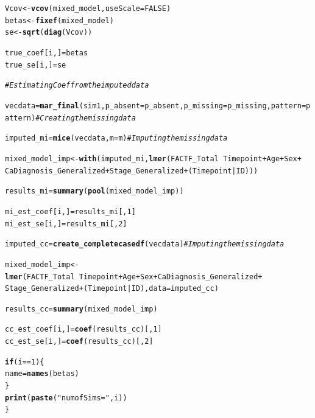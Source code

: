 \documentclass[fleqn,10pt]{wlscirep}\usepackage[]{graphicx}\usepackage[]{color}
\makeatletter
\newcommand{\hlnum}[1]{\textcolor[rgb]{0.686,0.059,0.569}{#1}}%
\newcommand{\hlstr}[1]{\textcolor[rgb]{0.192,0.494,0.8}{#1}}%
\newcommand{\hlcom}[1]{\textcolor[rgb]{0.678,0.584,0.686}{\textit{#1}}}%
\newcommand{\hlopt}[1]{\textcolor[rgb]{0,0,0}{#1}}%
\newcommand{\hlstd}[1]{\textcolor[rgb]{0.345,0.345,0.345}{#1}}%
\newcommand{\hlkwa}[1]{\textcolor[rgb]{0.161,0.373,0.58}{\textbf{#1}}}%
\newcommand{\hlkwb}[1]{\textcolor[rgb]{0.69,0.353,0.396}{#1}}%
\newcommand{\hlkwc}[1]{\textcolor[rgb]{0.333,0.667,0.333}{#1}}%
\newcommand{\hlkwd}[1]{\textcolor[rgb]{0.737,0.353,0.396}{\textbf{#1}}}%
\newenvironment{kframe}{%
 \def\at@end@of@kframe{}%
 \ifinner\ifhmode%
  \def\at@end@of@kframe{\end{minipage}}%
  \begin{minipage}{\columnwidth}%
 \fi\fi%
 \def\FrameCommand##1{\hskip\@totalleftmargin \hskip-\fboxsep
 \colorbox{shadecolor}{##1}\hskip-\fboxsep
     \hskip-\linewidth \hskip-\@totalleftmargin \hskip\columnwidth}%
 \MakeFramed {\advance\hsize-\width
   \@totalleftmargin\z@ \linewidth\hsize
   \@setminipage}}%
 {\par\unskip\endMakeFramed%
 \at@end@of@kframe}
\newenvironment{knitrout}{}{} %
\makeatother
\begin{document}
\begin{knitrout}
\begin{kframe}
\begin{alltt}
    \hlstd{Vcov} \hlkwb{<-} \hlkwd{vcov}\hlstd{(mixed_model,} \hlkwc{useScale} \hlstd{=} \hlnum{FALSE}\hlstd{)}
    \hlstd{betas} \hlkwb{<-} \hlkwd{fixef}\hlstd{(mixed_model)}
    \hlstd{se} \hlkwb{<-} \hlkwd{sqrt}\hlstd{(}\hlkwd{diag}\hlstd{(Vcov))}

    \hlstd{true_coef[i, ]} \hlkwb{=} \hlstd{betas}
    \hlstd{true_se[i, ]} \hlkwb{=} \hlstd{se}

    \hlcom{# Estimating Coef from the imputed data}

    \hlstd{vecdata} \hlkwb{=} \hlkwd{mar_final}\hlstd{(sim1,} \hlkwc{p_absent} \hlstd{= p_absent,} \hlkwc{p_missing} \hlstd{= p_missing,} \hlkwc{pattern} \hlstd{= pattern)} \hlcom{# Creating the missing data}

    \hlstd{imputed_mi} \hlkwb{=} \hlkwd{mice}\hlstd{(vecdata,} \hlkwc{m} \hlstd{= m)} \hlcom{# Imputing the missing data}

    \hlstd{mixed_model_imp} \hlkwb{<-} \hlkwd{with}\hlstd{(imputed_mi,}\hlkwd{lmer}\hlstd{(FACTF_Total} \hlopt{~} \hlstd{Timepoint} \hlopt{+} \hlstd{Age} \hlopt{+} \hlstd{Sex} \hlopt{+}
                          \hlstd{CaDiagnosis_Generalized} \hlopt{+} \hlstd{Stage_Generalized} \hlopt{+} \hlstd{(Timepoint}\hlopt{|}\hlstd{ID)))}

    \hlstd{results_mi} \hlkwb{=} \hlkwd{summary}\hlstd{(}\hlkwd{pool}\hlstd{(mixed_model_imp))}

    \hlstd{mi_est_coef[i,]} \hlkwb{=} \hlstd{results_mi[,} \hlnum{1} \hlstd{]}
    \hlstd{mi_est_se[i, ]} \hlkwb{=} \hlstd{results_mi[,} \hlnum{2} \hlstd{]}

    \hlstd{imputed_cc} \hlkwb{=} \hlkwd{create_completecasedf}\hlstd{(vecdata)} \hlcom{# Imputing the missing data}

    \hlstd{mixed_model_imp} \hlkwb{<-} \hlkwd{lmer}\hlstd{(FACTF_Total} \hlopt{~} \hlstd{Timepoint} \hlopt{+} \hlstd{Age} \hlopt{+} \hlstd{Sex} \hlopt{+} \hlstd{CaDiagnosis_Generalized} \hlopt{+}
                              \hlstd{Stage_Generalized} \hlopt{+} \hlstd{(Timepoint}\hlopt{|}\hlstd{ID),} \hlkwc{data} \hlstd{= imputed_cc)}

    \hlstd{results_cc} \hlkwb{=} \hlkwd{summary}\hlstd{(mixed_model_imp)}

    \hlstd{cc_est_coef[i,]} \hlkwb{=} \hlkwd{coef}\hlstd{(results_cc)[,}\hlnum{1}\hlstd{]}
    \hlstd{cc_est_se[i, ]} \hlkwb{=} \hlkwd{coef}\hlstd{(results_cc)[,}\hlnum{2}\hlstd{]}


    \hlkwa{if} \hlstd{(i}\hlopt{==}\hlnum{1}\hlstd{)\{}
      \hlstd{name} \hlkwb{=} \hlkwd{names}\hlstd{(betas)}
    \hlstd{\}}
    \hlkwd{print}\hlstd{(}\hlkwd{paste}\hlstd{(}\hlstr{"num of Sims = "}\hlstd{, i))}
  \hlstd{\}}


\end{alltt}
\end{kframe}
\end{knitrout}
\end{document}
